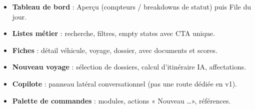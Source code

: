 \begin{itemize}[leftmargin=*]
  \item \textbf{Tableau de bord} : Aperçu (compteurs / breakdowns de statut) puis File du jour.
  \item \textbf{Listes métier} : recherche, filtres, empty states avec CTA unique.
  \item \textbf{Fiches} : détail véhicule, voyage, dossier, avec documents et scores.
  \item \textbf{Nouveau voyage} : sélection de dossiers, calcul d'itinéraire IA, affectations.
  \item \textbf{Copilote} : panneau latéral conversationnel (pas une route dédiée en v1).
  \item \textbf{Palette de commandes} : modules, actions « Nouveau \ldots », références.
\end{itemize}
